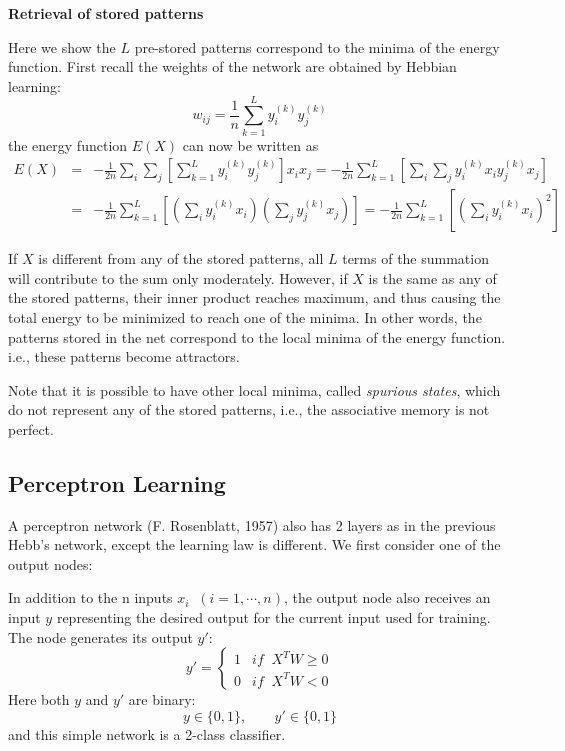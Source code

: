 {\bf Retrieval of stored patterns}

Here we show the $L$ pre-stored patterns correspond to the minima of the 
energy function. First recall the weights of the network are obtained by
Hebbian learning:
\[	w_{ij}=\frac{1}{n}\sum_{k=1}^L y_i^{(k)} y_j^{(k)}	\]
the energy function $E(X)$ can now be written as
\begin{eqnarray}
E(X) & = & -\frac{1}{2n}\sum_i \sum_j [\sum_{k=1}^L y_i^{(k)} y_j^{(k)}] x_i x_j
	= -\frac{1}{2n}\sum_{k=1}^L [\sum_i \sum_j y_i^{(k)} x_i y_j^{(k)} x_j]
		\nonumber	\\ 
  & = & -\frac{1}{2n}\sum_{k=1}^L [ (\sum_i y_i^{(k)} x_i) (\sum_j y_j^{(k)} x_j)]
		= -\frac{1}{2n}\sum_{k=1}^L [ (\sum_i y_i^{(k)} x_i)^2 ]
		\nonumber 	
\end{eqnarray}

If $X$ is different from any of the stored patterns, all $L$ terms of the 
summation will contribute to the sum only moderately. However, if $X$ is the 
same as any of the stored patterns, their inner product reaches maximum, and 
thus causing the total energy to be minimized to reach one of the minima.
In other words, the patterns stored in the net correspond to the local minima 
of the energy function. i.e., these patterns become attractors. 
 
Note that it is possible to have other local minima, called {\em spurious 
states}, which do not represent any of the stored patterns, i.e., the 
associative memory is not perfect.


\newpage
\subsection*{Perceptron Learning}

A perceptron network (F. Rosenblatt, 1957) also has 2 layers as in the
previous Hebb's network, except the learning law is different. We first 
consider one of the output nodes:

\vskip 2in

In addition to the n inputs $x_i\;\;(i=1,\cdots,n)$, the output node also
receives an input $y$ representing the desired output for the current input 
used for training. The node generates its output $y'$:
\[	y'=\left\{ \begin{array}{ll} 1 & if\;\;X^TW \geq 0 \\ 0 & if\;\;X^TW<0
		\end{array} \right.
\]
Here both $y$ and $y'$ are binary:
\[	y \in \{ 0,1\},\;\;\;\;\;\;\;y' \in \{0,1\}	\]
and this simple network is a 2-class classifier.

